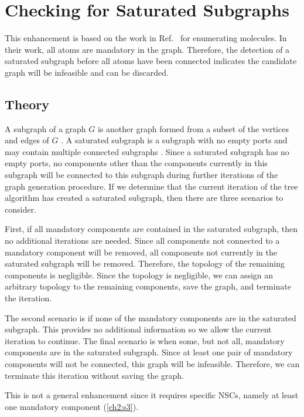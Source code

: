 \section{Checking for Saturated Subgraphs\label{sec:app1:saturated}}

This enhancement is based on the work in Ref.~\cite{Faulon2003b} for enumerating molecules. In their work, all atoms are mandatory in the graph. Therefore, the detection of a saturated subgraph before all atoms have been connected indicates the candidate graph will be infeasible and can be discarded.

\subsection{Theory}

A subgraph of a graph $G$ is another graph formed from a subset of the vertices and edges of $G$ \cite[p.~3]{Diestel2000a}.
A saturated subgraph is a subgraph with no empty ports and may contain multiple connected subgraphs \cite{Faulon2003b}.
Since a saturated subgraph has no empty ports, no components other than the components currently in this subgraph will be connected to this subgraph during further iterations of the graph generation procedure.
If we determine that the current iteration of the tree algorithm has created a saturated subgraph, then there are three scenarios to consider.

First, if all mandatory components are contained in the saturated subgraph, then no additional iterations are needed. Since all components not connected to a mandatory component will be removed, all components not currently in the saturated subgraph will be removed. Therefore, the topology of the remaining components is negligible. Since the topology is negligible, we can assign an arbitrary topology to the remaining components, save the graph, and terminate the iteration.

The second scenario is if none of the mandatory components are in the saturated subgraph. This provides no additional information so we allow the current iteration to continue. The final scenario is when some, but not all, mandatory components are in the saturated subgraph. Since at least one pair of mandatory components will not be connected, this graph will be infeasible. Therefore, we can terminate this iteration without saving the graph.

This is not a general enhancement since it requires specific NSCs, namely at least one mandatory component (\ref{ch2:s3}).

